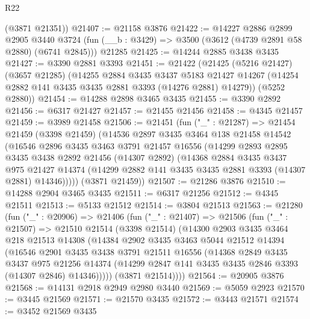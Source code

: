 \begin{lexlean}{R22}
\begin{coremodule}
      (@3871 @21351))
@21407 := @21158 @3876
@21422 := @14227
    @2886
    @2899
    @2905
    @3440
    @3724
    (fun (__b : @3429) => @3500 (@3612 (@4739 @2891 @58 @2880) (@6741 @2845)))
    @21285
@21425 := @14244 @2885 @3438 @3435
@21427 := @3390 @2881 @3393
@21451 := @21422
    (@21425
      (@5216 @21427)
      (@3657 @21285)
      (@14255
        @2884
        @3435
        @3437
        @5183
        @21427
        @14267
        (@14254 @2882 @141 @3435 @3435 @2881 @3393 (@14276 @2881) @14279))
      (@5252 @2880))
@21454 := @14288 @2898 @3465 @3435
@21455 := @3390 @2892
@21456 := @6317 @21427
@21457 := @21455 @21456
@21458 := @4345 @21457
@21459 := @3989 @21458
@21506 := @21451
    (fun ("_" : @21287) =>
    @21454
      @21459
      (@3398 @21459)
      (@14536
        @2897
        @3435
        @3464
        @138
        @21458
        @14542
        (@16546
          @2896
          @3435
          @3463
          @3791
          @21457
          @16556
          (@14299
            @2893
            @2895
            @3435
            @3438
            @2892
            @21456
            (@14307 @2892)
            (@14368
              @2884
              @3435
              @3437
              @975
              @21427
              @14374
              (@14299 @2882 @141 @3435 @3435 @2881 @3393 (@14307 @2881) @14346)))))
      (@3871 @21459))
@21507 := @21286 @3876
@21510 := @14288 @2904 @3465 @3435
@21511 := @6317 @21256
@21512 := @4345 @21511
@21513 := @5133 @21512
@21514 := @3804 @21513
@21563 := @21280
    (fun ("_" : @20906) =>
    @21406
      (fun ("_" : @21407) =>
      @21506
        (fun ("_" : @21507) =>
        @21510
          @21514
          (@3398 @21514)
          (@14300
            @2903
            @3435
            @3464
            @218
            @21513
            @14308
            (@14384
              @2902
              @3435
              @3463
              @5044
              @21512
              @14394
              (@16546
                @2901
                @3435
                @3438
                @3791
                @21511
                @16556
                (@14368
                  @2849
                  @3435
                  @3437
                  @975
                  @21256
                  @14374
                  (@14299 @2847 @141 @3435 @3435 @2846 @3393 (@14307 @2846) @14346)))))
          (@3871 @21514))))
@21564 := @20905 @3876
@21568 := @14131 @2918 @2949 @2980 @3440
@21569 := @5059 @2923
@21570 := @3445 @21569
@21571 := @21570 @3435
@21572 := @3443 @21571
@21574 := @3452 @21569 @3435

\end{coremodule}
\end{lexlean}
